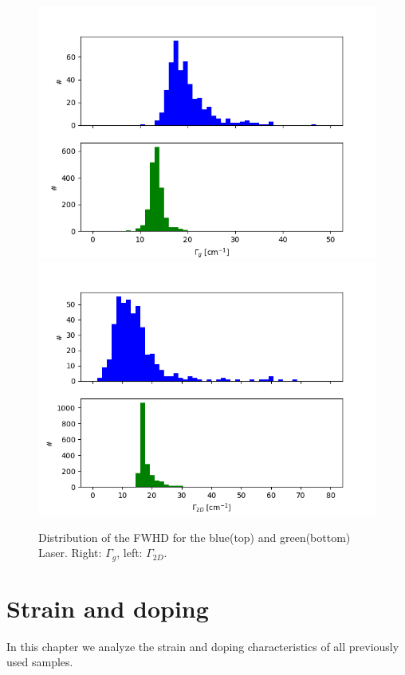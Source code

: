 \documentclass[12pt,a4paper]{article}
\begin{document}
\begin{figure}[h]
\centering
\includegraphics[scale=0.5]{Bilder/Laser/gammag_hist.png}
\includegraphics[scale=0.5]{Bilder/Laser/gamma2d_hist.png}
\caption{Distribution of the FWHD for the blue(top) and green(bottom) Laser. Right: $\Gamma_{g}$, left: $\Gamma_{2D}$.}
\label{fig:Laser_gamma_hist}
\end{figure}


\section{Strain and doping}
\label{sec:6}



In this chapter we analyze the strain and doping characteristics of all previously used samples.
\end{document}
